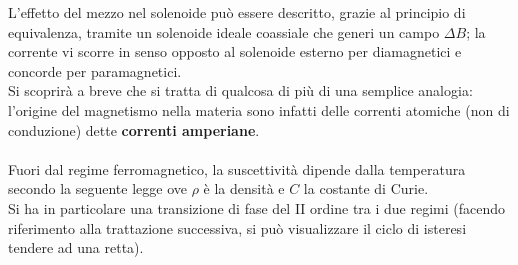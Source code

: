 L'effetto del mezzo nel solenoide può essere descritto, grazie al principio di equivalenza, tramite un solenoide ideale coassiale che generi un campo $\Delta B$; la corrente vi scorre in senso opposto al solenoide esterno per diamagnetici e concorde per paramagnetici. 
\\Si scoprirà a breve che si tratta di qualcosa di più di una semplice analogia: l'origine del magnetismo nella materia sono infatti delle correnti atomiche (non di conduzione) dette \textbf{correnti amperiane}.
\\~\\
Fuori dal regime ferromagnetico, la suscettività dipende dalla temperatura secondo la seguente legge
ove $\rho$ è la densità e $C$ la costante di Curie.
\\Si ha in particolare una transizione di fase del II ordine tra i due regimi (facendo riferimento alla trattazione successiva, si può visualizzare il ciclo di isteresi tendere ad una retta).


